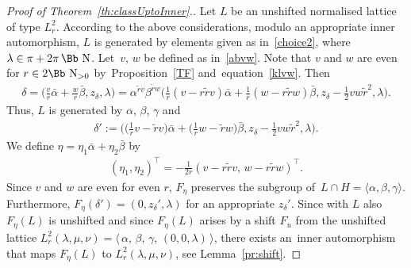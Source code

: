 \documentclass[pdftex]{sigma}
\newcommand\NN{{\mbox{\Bb N}}}
\newcommand\la{\langle}
\newcommand\ra{\rangle}
\numberwithin{equation}{section}
\begin{document}
\begin{proof}[Proof of Theorem~\ref{th:classUptoInner}.]
Let $L$ be an unshifted normalised lattice of type $L^2_r$. According to the above considerations, modulo an appropriate inner automorphism, $L$ is generated by elements given as in~\eqref{choice2}, where $\lambda\in\pi+2\pi\,\NN$. Let~$v$, $w$ be defined as in~\eqref{abvw}.
Note that $v$ and $w$ are even for $r\in2\NN_{>0}$ by~Proposition~\ref{TF} and~equation~\eqref{klvw}.
Then
\begin{gather*}
\delta= \bigg(\frac{v}{r}\bar\alpha+\frac{w}{r}\bar\beta,z_\delta,\lambda\bigg)
= \alpha^{\tilde rv}\beta^{\tilde rw}\bigg(\frac{1}{r}(v-r\tilde rv)\bar\alpha+\frac{1}{r}(w-r\tilde rw)\bar\beta,z_\delta-\frac12 vw\tilde r^2,\lambda\bigg).
\end{gather*}
Thus, $L$ is generated by $\alpha$, $\beta$, $\gamma$ and
\begin{gather*}
\delta':=\bigg(\bigg(\frac{1}{r}v-\tilde rv\bigg)\bar\alpha+\bigg(\frac{1}{r}w-\tilde rw\bigg)\bar\beta,z_\delta-\frac12 vw\tilde r^2,\lambda\bigg).
\end{gather*}
We define $\eta=\eta_1\bar \alpha +\eta_2\bar\beta$ by
\begin{gather*}
(\eta_1,\eta_2)^\top=-\frac{1}{2r}(v-r\tilde rv,\,w-r\tilde rw)^\top.
\end{gather*}
Since $v$ and $w$ are even for even $r$, $F_{\eta}$ preserves the subgroup of~$L\cap H=\la \alpha,\beta,\gamma\ra$. Furthermore, $F_{\eta}(\delta')=(0,z_\delta',\lambda)$ for an appropriate $z_\delta'$. Since with $L$ also $F_\eta(L)$ is unshifted and since $F_\eta(L)$ arises by a shift $F_u$ from the unshifted lattice $L^2_r(\lambda,\mu,\nu)=\big\langle\,\alpha,\,\beta,\,\gamma,\,(0,0,\lambda)\,\big\rangle$, there exists an~inner automorphism that maps $F_{ \eta}(L)$ to $L^2_r(\lambda,\mu,\nu)$, see Lemma~\ref{pr:shift}.


\end{proof}
\end{document}
